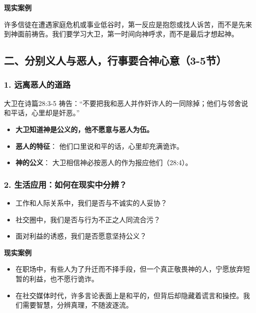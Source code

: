 \documentclass[a4paper, 12pt]{article}
\begin{document}
\textbf{现实案例}



许多信徒在遭遇家庭危机或事业低谷时，第一反应是抱怨或找人诉苦，而不是先来到神面前祷告。我们要学习大卫，第一时间向神呼求，而不是最后才想起神。
\subsection*{二、分别义人与恶人，行事要合神心意（3-5节）}
\subsubsection*{1. 远离恶人的道路}
\hspace{0.6cm}大卫在诗篇28:3-5 祷告：“不要把我和恶人并作奸诈人的一同除掉；他们与邻舍说和平话，心里却是奸恶。”
\begin{itemize}
    \item \textbf{大卫知道神是公义的，他不愿意与恶人为伍。}

    \item \textbf{恶人的特征}： 他们口里说和平的话，心里却充满诡诈。

    \item \textbf{神的公义}： 大卫相信神必按恶人的作为报应他们（28:4）。

\end{itemize}
\subsubsection*{2. 生活应用：如何在现实中分辨？}
\begin{itemize}
    \item 工作和人际关系中，我们是否与不诚实的人妥协？

    \item 社交圈中，我们是否与行为不正之人同流合污？

    \item 面对利益的诱惑，我们是否愿意坚持公义？

\end{itemize}

\textbf{现实案例}
\begin{itemize}
    \item 在职场中，有些人为了升迁而不择手段，但一个真正敬畏神的人，宁愿放弃短暂的利益，也不愿行诡诈。

    \item 在社交媒体时代，许多言论表面上是和平的，但背后却隐藏着谎言和操控。我们需要智慧，分辨真理，不随波逐流。

\end{itemize}
\end{document}
